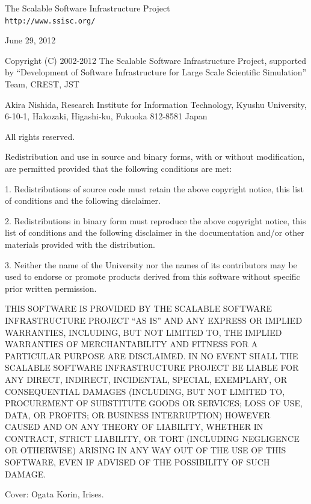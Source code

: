 \documentclass[a4paper]{article}
\begin{document}
\begin{flushleft}
{\large The Scalable Software Infrastructure
Project\\
{\tt http://www.ssisc.org/}}\\
\end{flushleft}
\vspace*{5mm}
\begin{flushleft}
June 29, 2012
\end{flushleft}
\thispagestyle{empty}
\newpage
\begin{flushleft}
{\small
Copyright (C) 2002-2012 The Scalable Software Infrastructure Project,
supported by ``Development of Software Infrastructure for Large Scale
Scientific Simulation'' Team, CREST, JST

Akira Nishida, Research Institute for Information Technology, 
Kyushu University, 6-10-1, Hakozaki, Higashi-ku, Fukuoka 812-8581 Japan

All rights reserved.

\vspace*{5mm}
Redistribution and use in source and binary forms, with or without
modification, are permitted provided that the following conditions are
 met:

1. Redistributions of source code must retain the above copyright
 notice, 
   this list of conditions and the following disclaimer. 

2. Redistributions in binary form must reproduce the above copyright
 notice,
   this list of conditions and the following disclaimer in the
 documentation
   and/or other materials provided with the distribution. 

3. Neither the name of the University nor the names of its contributors
 may 
   be used to endorse or promote products derived from this software
 without
   specific prior written permission. 

\vspace*{5mm}
THIS SOFTWARE IS PROVIDED BY THE SCALABLE SOFTWARE INFRASTRUCTURE
 PROJECT 
``AS IS'' AND ANY EXPRESS OR IMPLIED WARRANTIES, INCLUDING, BUT NOT
 LIMITED
TO, THE IMPLIED WARRANTIES OF MERCHANTABILITY AND FITNESS FOR A
 PARTICULAR
PURPOSE ARE DISCLAIMED. IN NO EVENT SHALL THE SCALABLE SOFTWARE
 INFRASTRUCTURE
PROJECT BE LIABLE FOR ANY DIRECT, INDIRECT, INCIDENTAL, SPECIAL,
 EXEMPLARY,
OR CONSEQUENTIAL DAMAGES (INCLUDING, BUT NOT LIMITED TO, PROCUREMENT OF
SUBSTITUTE GOODS OR SERVICES; LOSS OF USE, DATA, OR PROFITS; OR BUSINESS
INTERRUPTION) HOWEVER CAUSED AND ON ANY THEORY OF LIABILITY, WHETHER IN
CONTRACT, STRICT LIABILITY, OR TORT (INCLUDING NEGLIGENCE OR OTHERWISE)
ARISING IN ANY WAY OUT OF THE USE OF THIS SOFTWARE, EVEN IF ADVISED OF
 THE
POSSIBILITY OF SUCH DAMAGE.

\vfill
Cover: Ogata Korin, Irises.
}
\end{flushleft}
\thispagestyle{empty}
\end{document}
